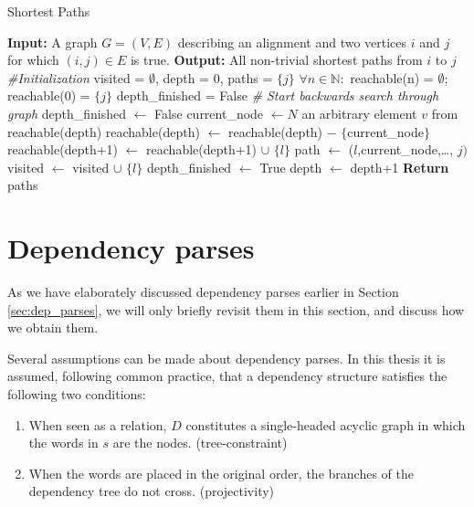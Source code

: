 \begin{algorithm}
\caption{Shortest Paths}\label{alg:shortest paths}
\begin{algorithmic}
\STATE \textbf{Input:} A graph $G = (V,E)$ describing an alignment and two vertices $i$ and $j$ for which $(i,j)\in E$ is true.
\STATE \textbf{Output:} All non-trivial shortest paths from $i$ to $j$
\STATE \textit{\#Initialization}
\STATE visited = $\emptyset$, depth = $0$, paths = $\{j\}$
\STATE $\forall n\in\mathbb{N}:$ reachable(n) = $\emptyset$; reachable($0$) = $\{j\}$
\STATE depth\_finished = False
\STATE \textit{\# Start backwards search through graph}
		\STATE depth\_finished $\leftarrow$ False
		\STATE current\_node $\leftarrow N$ an arbitrary element $v$ from reachable(depth)
		\STATE reachable(depth) $\leftarrow$ reachable(depth) $-$ $\{$current\_node$\}$
				\STATE reachable(depth+1) $\leftarrow$ reachable(depth+1) $\cup$ $\{l\}$
					\STATE path $\leftarrow$ ($l$,current\_node,\ldots, $j)$
				\ENDFOR
			\ENDIF
		\STATE visited $\leftarrow$ visited $\cup$ $\{l\}$
		\ENDFOR
	\STATE depth\_finished $\leftarrow$ True
	\STATE depth $\leftarrow$ depth+1
	\ENDWHILE
\ENDWHILE
\STATE \textbf{Return} paths
\end{algorithmic}
\end{algorithm}


\section{Dependency parses}
\label{sec:depparses}

As we have elaborately discussed dependency parses earlier in Section \ref{sec:dep_parses}, we will only briefly revisit them in this section, and discuss how we obtain them.

Several assumptions can be made about dependency parses. In this thesis it is assumed, following common practice, that a dependency structure satisfies the following two conditions:\begin{enumerate}
\item When seen as a relation, $D$ constitutes a single-headed acyclic graph in which the words in $s$ are the nodes. (tree-constraint)
\item When the words are placed in the original order, the branches of the dependency tree do not cross. (projectivity)
\end{enumerate}

